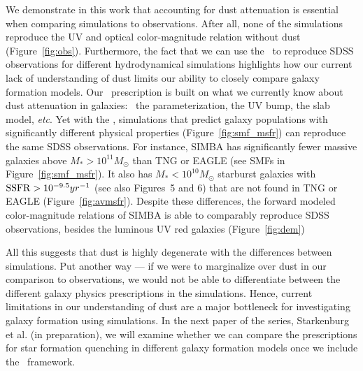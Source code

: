 We demonstrate in this work that accounting for dust attenuation is
essential when comparing simulations to observations. 
After all, none of the simulations reproduce the UV and optical
color-magnitude relation without dust (Figure~\ref{fig:obs}). 
Furthermore, the fact that we can use the \eda~to reproduce SDSS observations 
for different hydrodynamical simulations highlights how our current lack of 
understanding of dust limits our ability to closely compare galaxy
formation models. 
Our \eda~prescription is built on what we currently know about dust attenuation
in galaxies: \eg~the \citealt{noll2009} parameterization, the UV bump, the slab
model, \emph{etc}.
Yet with the \eda, simulations that predict galaxy populations with
significantly different physical properties (Figure~\ref{fig:smf_msfr}) can
reproduce the same SDSS observations. 
For instance, SIMBA has significantly fewer massive galaxies above $M_* >
10^{11}M_\odot$ than TNG or EAGLE (see SMFs in Figure~\ref{fig:smf_msfr}). 
It also has $M_* < 10^{10}M_\odot$ starburst galaxies with ${\rm SSFR} >
10^{-9.5}yr^{-1}$ (see also \citealt{dave2019} Figures~5 and 6)
that are not found in TNG or EAGLE (Figure~\ref{fig:avmsfr}). 
Despite these differences, the forward modeled color-magnitude relations of
SIMBA is able to comparably reproduce SDSS observations, besides the
luminous UV red galaxies (Figure~\ref{fig:dem})

All this suggests that dust is highly degenerate with the differences between simulations. 
Put another way --- if we were to marginalize over dust in our comparison to
observations, we would not be able to differentiate between the different
galaxy physics prescriptions in the simulations. 
Hence, current limitations in our understanding of dust are a major bottleneck
for investigating galaxy formation using simulations.
In the next paper of the series, Starkenburg et al. (in preparation), we
will examine whether we can compare the prescriptions for star formation
quenching in different galaxy formation models once we include the
\eda~framework.


